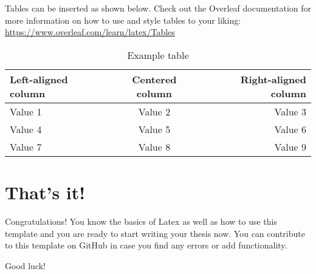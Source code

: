 Tables can be inserted as shown below. Check out the Overleaf documentation for more information on how to use and style tables to your liking: \url{https://www.overleaf.com/learn/latex/Tables}

\begin{table}[ht]   %
    \centering
    \footnotesize
    \begin{tabular}{lcr} %
        \toprule    %
        Left-aligned column  & Centered column  & Right-aligned column \\
        \midrule    %
        Value 1 & Value 2 & Value 3 \\
        Value 4 & Value 5 & Value 6 \\
        Value 7 & Value 8 & Value 9 \\
        \bottomrule %
    \end{tabular}
    \caption{Example table}
    \label{table:example_table}
\end{table}


%


\section{That's it!}
Congratulations! You know the basics of Latex as well as how to use this template and you are ready to start writing your thesis now. You can contribute to this template on GitHub in case you find any errors or add functionality.\par

Good luck!